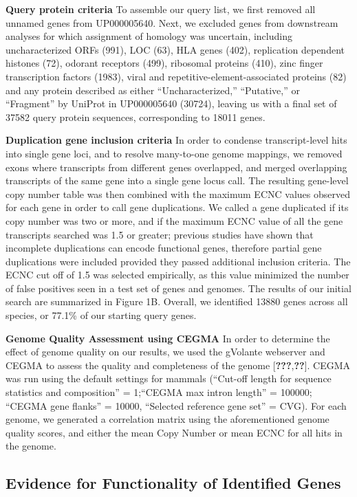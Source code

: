 \documentclass[10pt,letterpaper]{article}
\begin{document}
\textbf{Query protein criteria} To assemble our query list, we first
removed all unnamed genes from UP000005640. Next, we excluded genes from
downstream analyses for which assignment of homology was uncertain,
including uncharacterized ORFs (991), LOC (63), HLA genes (402),
replication dependent histones (72), odorant receptors (499), ribosomal
proteins (410), zinc finger transcription factors (1983), viral and
repetitive-element-associated proteins (82) and any protein described as
either ``Uncharacterized,'' ``Putative,'' or ``Fragment'' by UniProt in
UP000005640 (30724), leaving us with a final set of 37582 query protein
sequences, corresponding to 18011 genes.

\textbf{Duplication gene inclusion criteria} In order to condense
transcript-level hits into single gene loci, and to resolve many-to-one
genome mappings, we removed exons where transcripts from different genes
overlapped, and merged overlapping transcripts of the same gene into a
single gene locus call. The resulting gene-level copy number table was
then combined with the maximum ECNC values observed for each gene in
order to call gene duplications. We called a gene duplicated if its copy
number was two or more, and if the maximum ECNC value of all the gene
transcripts searched was 1.5 or greater; previous studies have shown
that incomplete duplications can encode functional genes, therefore
partial gene duplications were included provided they passed additional
inclusion criteria. The ECNC cut off of 1.5 was selected empirically, as
this value minimized the number of false positives seen in a test set of
genes and genomes. The results of our initial search are summarized in
Figure 1B. Overall, we identified 13880 genes across all species, or
77.1\% of our starting query genes.

\textbf{Genome Quality Assessment using CEGMA} In order to determine the
effect of genome quality on our results, we used the gVolante webserver
and CEGMA to assess the quality and completeness of the genome
{[}{\textbf{???}},{\textbf{??}}{]}. CEGMA was run using the default
settings for mammals (``Cut-off length for sequence statistics and
composition'' = 1;``CEGMA max intron length'' = 100000; ``CEGMA gene
flanks'' = 10000, ``Selected reference gene set'' = CVG). For each
genome, we generated a correlation matrix using the aforementioned
genome quality scores, and either the mean Copy Number or mean ECNC for
all hits in the genome.

\hypertarget{evidence-for-functionality-of-identified-genes}{%
\subsection{Evidence for Functionality of Identified
Genes}\label{evidence-for-functionality-of-identified-genes}}
\end{document}
